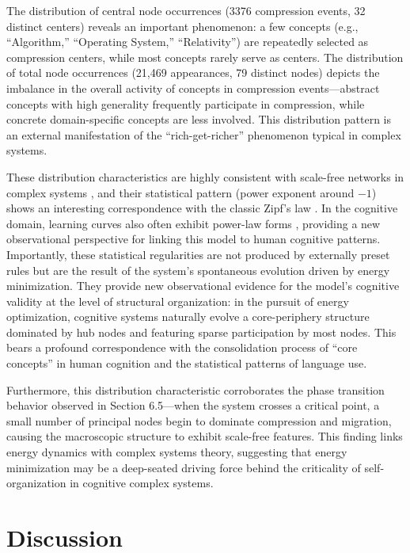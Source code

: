 \documentclass[10pt,onecolumn]{article}
\begin{document}
The distribution of central node occurrences (3376 compression events, 32 distinct centers) reveals an important phenomenon: a few concepts (e.g., “Algorithm,” “Operating System,” “Relativity”) are repeatedly selected as compression centers, while most concepts rarely serve as centers. The distribution of total node occurrences (21,469 appearances, 79 distinct nodes) depicts the imbalance in the overall activity of concepts in compression events—abstract concepts with high generality frequently participate in compression, while concrete domain-specific concepts are less involved. This distribution pattern is an external manifestation of the “rich-get-richer” phenomenon typical in complex systems.

These distribution characteristics are highly consistent with scale-free networks in complex systems \citep{newman2005power}, and their statistical pattern (power exponent around $-1$) shows an interesting correspondence with the classic Zipf’s law \citep{zipf1949human}. In the cognitive domain, learning curves also often exhibit power-law forms \citep{anderson2001power}, providing a new observational perspective for linking this model to human cognitive patterns. Importantly, these statistical regularities are not produced by externally preset rules but are the result of the system’s spontaneous evolution driven by energy minimization. They provide new observational evidence for the model’s cognitive validity at the level of structural organization: in the pursuit of energy optimization, cognitive systems naturally evolve a core-periphery structure dominated by hub nodes and featuring sparse participation by most nodes. This bears a profound correspondence with the consolidation process of “core concepts” in human cognition and the statistical patterns of language use.

Furthermore, this distribution characteristic corroborates the phase transition behavior observed in Section 6.5—when the system crosses a critical point, a small number of principal nodes begin to dominate compression and migration, causing the macroscopic structure to exhibit scale-free features. This finding links energy dynamics with complex systems theory, suggesting that energy minimization may be a deep-seated driving force behind the criticality of self-organization in cognitive complex systems.

\section{Discussion}
\end{document}
